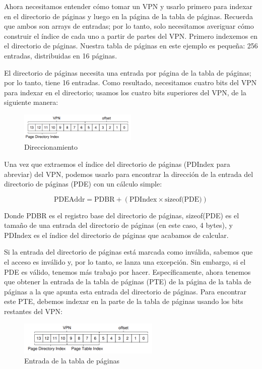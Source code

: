 \documentclass{article}
\begin{document}
Ahora necesitamos entender cómo tomar un VPN y usarlo primero para indexar en el directorio de páginas y luego en la página de la tabla de páginas. Recuerda que ambos son arrays de entradas; por lo tanto, solo necesitamos averiguar cómo construir el índice de cada uno a partir de partes del VPN. Primero indexemos en el directorio de páginas. Nuestra tabla de páginas en este ejemplo es pequeña: 256 entradas, distribuidas en 16 páginas. 

El directorio de páginas necesita una entrada por página de la tabla de páginas; por lo tanto, tiene 16 entradas. Como resultado, necesitamos cuatro bits del VPN para indexar en el directorio; usamos los cuatro bits superiores del VPN, de la siguiente manera:

\begin{figure}[h]
    \centering
    \includegraphics[width=0.5\textwidth]{src/direccionamiento.png}
    \caption{Direccionamiento}
\end{figure}

Una vez que extraemos el índice del directorio de páginas (PDIndex para abreviar) del VPN, podemos usarlo para encontrar la dirección de la entrada del directorio de páginas (PDE) con un cálculo simple:

\begin{equation*}
    \text{PDEAddr} = \text{PDBR} + (\text{PDIndex} \times \text{sizeof(PDE)})
\end{equation*}

Donde PDBR es el registro base del directorio de páginas, sizeof(PDE) es el tamaño de una entrada del directorio de páginas (en este caso, 4 bytes), y PDIndex es el índice del directorio de páginas que acabamos de calcular. 

Si la entrada del directorio de páginas está marcada como inválida, sabemos que el acceso es inválido y, por lo tanto, se lanza una excepción. Sin embargo, si el PDE es válido, tenemos más trabajo por hacer. Específicamente, ahora tenemos que obtener la entrada de la tabla de páginas (PTE) de la página de la tabla de páginas a la que apunta esta entrada del directorio de páginas. Para encontrar este PTE, debemos indexar en la parte de la tabla de páginas usando los bits restantes del VPN:

\begin{figure}[h]
    \centering
    \includegraphics[width=0.6\textwidth]{src/pte2.png}
    \caption{Entrada de la tabla de páginas}
\end{figure}
\end{document}
